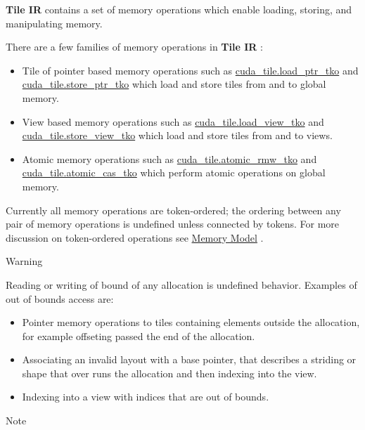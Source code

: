 \documentclass{article}
\begin{document}
\textbf{Tile IR} contains a set of memory operations which enable loading, storing, and manipulating memory.


There are a few families of memory operations in \textbf{Tile IR} :


\begin{itemize}
\item Tile of pointer based memory operations such as \href{https://docs.nvidia.com/cuda/tile-ir/latest/sections/operations.html#op-cuda-tile-load-ptr-tko}{cuda\_tile.load\_ptr\_tko} and \href{https://docs.nvidia.com/cuda/tile-ir/latest/sections/operations.html#op-cuda-tile-store-ptr-tko}{cuda\_tile.store\_ptr\_tko} which load and store tiles from and to global memory.
\item View based memory operations such as \href{https://docs.nvidia.com/cuda/tile-ir/latest/sections/operations.html#op-cuda-tile-load-view-tko}{cuda\_tile.load\_view\_tko} and \href{https://docs.nvidia.com/cuda/tile-ir/latest/sections/operations.html#op-cuda-tile-store-view-tko}{cuda\_tile.store\_view\_tko} which load and store tiles from and to views.
\item Atomic memory operations such as \href{https://docs.nvidia.com/cuda/tile-ir/latest/sections/operations.html#op-cuda-tile-atomic-rmw-tko}{cuda\_tile.atomic\_rmw\_tko} and \href{https://docs.nvidia.com/cuda/tile-ir/latest/sections/operations.html#op-cuda-tile-atomic-cas-tko}{cuda\_tile.atomic\_cas\_tko} which perform atomic operations on global memory.

\end{itemize}
Currently all memory operations are token-ordered; the ordering between any pair of memory operations is undefined unless connected by tokens. For more discussion on token-ordered operations see \href{https://docs.nvidia.com/cuda/tile-ir/latest/sections/memory_model.html#section-memory-model}{Memory Model} .


Warning


Reading or writing of bound of any allocation is undefined behavior. Examples of out of bounds access are:

\begin{itemize}
\item Pointer memory operations to tiles containing elements outside the allocation, for example offseting passed the end of the allocation.
\item Associating an invalid layout with a base pointer, that describes a striding or shape that over runs the allocation and then indexing into the view.
\item Indexing into a view with indices that are out of bounds.


\end{itemize}
Note
\end{document}
